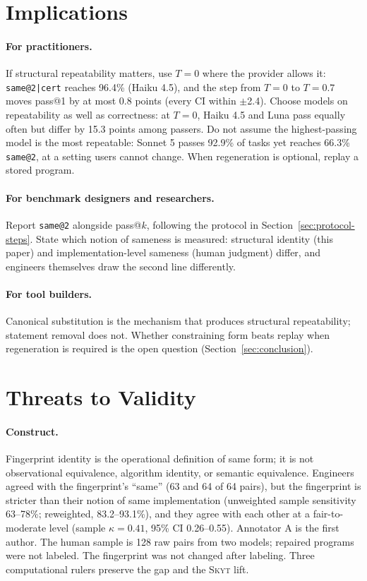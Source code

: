 \documentclass[acmsmall,screen,review,anonymous]{acmart}
\makeatletter
\newcommand{\skyt}{\textsc{Skyt}}
\newcommand{\sameat}{\mbox{\texttt{same@2}}}
\newcommand{\sameatc}{\mbox{\texttt{same@2|cert}}}
\makeatother
\begin{document}
\section{Implications}
\label{sec:implications}

\paragraph{For practitioners.}
If structural repeatability matters, use $T{=}0$ where the provider allows it:
\sameatc{} reaches 96.4\% (Haiku 4.5), and the step from $T{=}0$ to $T{=}0.7$ moves pass@1 by at most 0.8 points (every CI within $\pm$2.4).
Choose models on repeatability as well as correctness: at $T{=}0$, Haiku 4.5 and
Luna pass equally often but differ by 15.3 points among passers.
Do not assume the highest-passing model is the most repeatable: Sonnet 5 passes
92.9\% of tasks yet reaches 66.3\% \sameat{}, at a setting users cannot change.
When regeneration is optional, replay a stored program.

\paragraph{For benchmark designers and researchers.}
Report \sameat{} alongside pass@$k$, following the protocol in
Section~\ref{sec:protocol-steps}.
State which notion of sameness is measured: structural identity (this paper)
and implementation-level sameness (human judgment) differ, and engineers
themselves draw the second line differently.

\paragraph{For tool builders.}
Canonical substitution is the mechanism that produces structural
repeatability; statement removal does not.
Whether constraining form beats replay when regeneration is required is the
open question (Section~\ref{sec:conclusion}).

\section{Threats to Validity}
\label{sec:threats}

\paragraph{Construct.}
Fingerprint identity is the operational definition of same form; it is not
observational equivalence, algorithm identity, or semantic equivalence.
Engineers agreed with the fingerprint's ``same'' (63 and 64 of 64 pairs), but
the fingerprint is stricter than their notion of same implementation
(unweighted sample sensitivity 63--78\%; reweighted, 83.2--93.1\%), and
they agree with each other at a fair-to-moderate level (sample
$\kappa{=}0.41$, 95\% CI 0.26--0.55).
Annotator A is the first author.
The human sample is 128 raw pairs from two models; repaired programs were not
labeled.
The fingerprint was not changed after labeling.
Three computational rulers preserve the gap and the \skyt{} lift.
\end{document}

